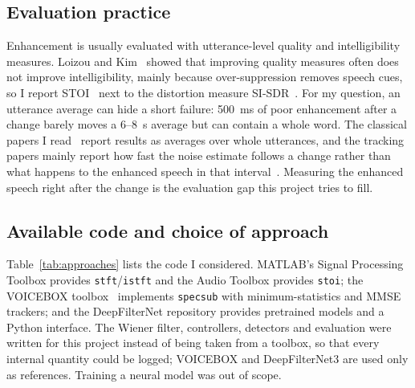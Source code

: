 \documentclass[10pt,conference,a4paper]{IEEEtran}
\begin{document}
\subsection{Evaluation practice}
Enhancement is usually evaluated with utterance-level quality and intelligibility
measures. Loizou and Kim~\cite{loizou2011reasons} showed that improving quality
measures often does not improve intelligibility, mainly because over-suppression
removes speech cues, so I report STOI~\cite{taal2011stoi} next to the
distortion measure SI-SDR~\cite{leroux2019sdr}. For my question, an utterance average can hide a short failure: 500~ms of poor
enhancement after a change barely moves a 6--8~s average but can contain a whole
word. The classical papers I read~\cite{boll1979spectral,scalart1996apriori,loizou2011reasons}
report results as averages over whole utterances, and the tracking papers mainly
report how fast the noise estimate follows a change rather than what happens to
the enhanced speech in that interval~\cite{martin2001noise,gerkmann2012unbiased}.
Measuring the enhanced speech right after the change is the evaluation gap this
project tries to fill.

\subsection{Available code and choice of approach}
Table~\ref{tab:approaches} lists the code I considered. MATLAB's Signal
Processing Toolbox provides \texttt{stft}/\texttt{istft} and the Audio
Toolbox provides \texttt{stoi}; the VOICEBOX toolbox~\cite{brookes_voicebox}
implements \texttt{specsub} with minimum-statistics and MMSE trackers; and the
DeepFilterNet repository provides pretrained models and a Python interface. The
Wiener filter, controllers, detectors and evaluation were written for this
project instead of being taken from a toolbox, so that every internal quantity
could be logged; VOICEBOX and DeepFilterNet3 are used only as references. Training a neural model was out of scope.
\end{document}
